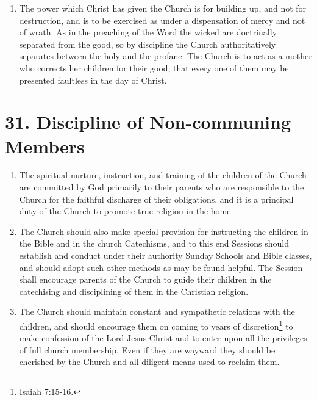 \documentclass[
]{book}
\providecommand{\tightlist}{%
  \setlength{\itemsep}{0pt}\setlength{\parskip}{0pt}}
\begin{document}
\begin{enumerate}
\def\labelenumi{\arabic{enumi}.}
\setcounter{enumi}{3}
\tightlist
\item
  \protect\hypertarget{30.4}{\href{}{}}The power which Christ has given the Church is for building up, and not for destruction, and is to be exercised as under a dispensation of mercy and not of wrath. As in the preaching of the Word the wicked are doctrinally separated from the good, so by discipline the Church authoritatively separates between the holy and the profane. The Church is to act as a mother who corrects her children for their good, that every one of them may be presented faultless in the day of Christ.
\end{enumerate}

\hypertarget{discipline-of-non-communing-members}{%
\section*{31. Discipline of Non-communing Members}\label{discipline-of-non-communing-members}}

\protect\hypertarget{chapter-slug-31-discipline-of-non-communing-members}{\href{}{}}

\begin{enumerate}
\def\labelenumi{\arabic{enumi}.}
\tightlist
\item
  \protect\hypertarget{31}{\href{}{}}The spiritual nurture, instruction, and training of the children of the Church are committed by God primarily to their parents who are responsible to the Church for the faithful discharge of their obligations, and it is a principal duty of the Church to promote true religion in the home.
\item
  The Church should also make special provision for instructing the children in the Bible and in the church Catechisms, and to this end Sessions should establish and conduct under their authority Sunday Schools and Bible classes, and should adopt such other methods as may be found helpful. The Session shall encourage parents of the Church to guide their children in the catechising and disciplining of them in the Christian religion.
\item
  The Church should maintain constant and sympathetic relations with the children, and should encourage them on coming to years of discretion\footnote{Isaiah 7:15-16.} to make confession of the Lord Jesus Christ and to enter upon all the privileges of full church membership. Even if they are wayward they should be cherished by the Church and all diligent means used to reclaim them.
\end{enumerate}
\end{document}
